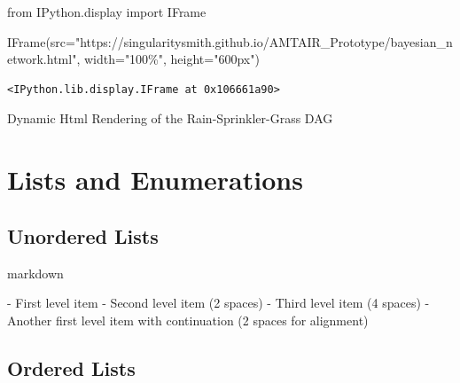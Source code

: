 \documentclass[
  11pt,
  letterpaper,
]{book}
\newenvironment{Shaded}{\begin{snugshade}}{\end{snugshade}}
\newcommand{\ImportTok}[1]{\textcolor[rgb]{0.00,0.46,0.62}{#1}}
\newcommand{\NormalTok}[1]{\textcolor[rgb]{0.00,0.23,0.31}{#1}}
\newcommand{\OperatorTok}[1]{\textcolor[rgb]{0.37,0.37,0.37}{#1}}
\newcommand{\SpecialStringTok}[1]{\textcolor[rgb]{0.13,0.47,0.30}{#1}}
\newcommand{\StringTok}[1]{\textcolor[rgb]{0.13,0.47,0.30}{#1}}
\begin{document}
\begin{Shaded}
\begin{Highlighting}[]
\ImportTok{from}\NormalTok{ IPython.display }\ImportTok{import}\NormalTok{ IFrame}

\NormalTok{IFrame(src}\OperatorTok{=}\StringTok{"https://singularitysmith.github.io/AMTAIR\_Prototype/bayesian\_network.html"}\NormalTok{, width}\OperatorTok{=}\StringTok{"100\%"}\NormalTok{, height}\OperatorTok{=}\StringTok{"600px"}\NormalTok{)}
\end{Highlighting}
\end{Shaded}

\label{rain_sprinkler_grass_example_network_rendering}
\begin{verbatim}
<IPython.lib.display.IFrame at 0x106661a90>
\end{verbatim}

Dynamic Html Rendering of the Rain-Sprinkler-Grass DAG

\section*{Lists and Enumerations}\label{lists-and-enumerations}


\subsection*{Unordered Lists}\label{unordered-lists}

markdown

\begin{Shaded}
\begin{Highlighting}[]
\SpecialStringTok{{-} }\NormalTok{First level item}
\SpecialStringTok{  {-} }\NormalTok{Second level item (2 spaces)}
\SpecialStringTok{    {-} }\NormalTok{Third level item (4 spaces)}
\SpecialStringTok{{-} }\NormalTok{Another first level item}
\NormalTok{  with continuation (2 spaces for alignment)}
\end{Highlighting}
\end{Shaded}

\subsection*{Ordered Lists}\label{ordered-lists}
\end{document}
